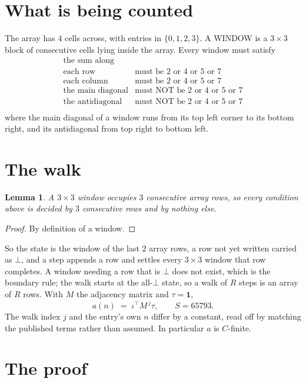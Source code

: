 \documentclass[11pt,a4paper]{article}
\theoremstyle{plain}
\newtheorem{lemma}[theorem]{Lemma}
\theoremstyle{definition}
\begin{document}
\section{What is being counted}

The array has $4$ cells across, with entries in $\{0,1,2,3\}$. A WINDOW is a $3\times3$ block
of consecutive cells lying inside the array. Every window must satisfy
\[
\begin{array}{ll}
\text{the sum along} & \text{} \\[2pt]
\text{each row} & \text{must be 2 or 4 or 5 or 7} \\
\text{each column} & \text{must be 2 or 4 or 5 or 7} \\
\text{the main diagonal} & \text{must NOT be 2 or 4 or 5 or 7} \\
\text{the antidiagonal} & \text{must NOT be 2 or 4 or 5 or 7} \\
\end{array}
\]
where the main diagonal of a window runs from its top left corner to its bottom right, and its
antidiagonal from top right to bottom left.

\section{The walk}

\begin{lemma}\label{lem:win}
A $3\times3$ window occupies $3$ consecutive array rows, so every condition above is
decided by $3$ consecutive rows and by nothing else.
\end{lemma}

\begin{proof}
By definition of a window.
\end{proof}

So the state is the window of the last $2$ array rows, a row not yet written carried as
$\bot$, and a step appends a row and settles every $3\times3$ window that row completes. A
window needing a row that is $\bot$ does not exist, which is the boundary rule; the walk starts
at the all-$\bot$ state, so a walk of $R$ steps is an array of $R$ rows. With $M$ the adjacency
matrix and $\tau=\mathbf{1}$,
\[
a(n)\;=\;\iota^{\!\top}M^{\,j}\tau ,\qquad S=65793.
\]
The walk index $j$ and the entry's own $n$ differ by a constant, read off by matching the
published terms rather than assumed. In particular $a$ is $C$-finite.

\section{The proof}
\end{document}
